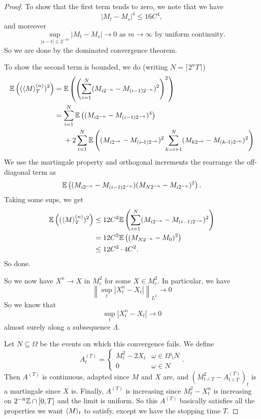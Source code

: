 \documentclass[a4paper]{article}
\begin{document}
\begin{proof}
  To show that the first term tends to zero, we note that we have
  \[
    |M_t - M_s|^4 \leq 16 C^4,
  \]
  and moreover
  \[
    \sup_{|s - t| \leq 2^{-m}} |M_t - M_s| \to 0\text{ as }m \to \infty\text{ by uniform continuity}.
  \]
  So we are done by the dominated convergence theorem.

  To show the second term is bounded, we do (writing $N = \lceil 2^n T\rceil$)
  \begin{align*}
    \E\left((\bra M\ket_T^{(n)})^2\right) &= \E \left(\left(\sum_{i = 1}^{N} (M_{i 2^{-n}} - M_{(i - 1)2^{-n}})^2 \right)^2\right)\\
    &= \sum_{i = 1}^N \E \left( (M_{i 2^{-n}}- M_{(i - 1)2^{-n}})^4\right) \\
    &\hphantom{{}={}}+ 2 \sum_{i = 1}^N\E \left((M_{i 2^{-\!n}} - M_{(i\!-\!1)2^{-\!n}})^2 \sum_{k = i + 1}^N (M_{k2^{-\!n}} - M_{(k\!-\!1)2^{-\!n}})^2\right)
  \end{align*}
  We use the martingale property and orthogonal increments the rearrange the off-diagonal term as
  \[
    \mathbb{E}\left((M_{i2^{-n}} - M_{(i - 1)2^{-n}})(M_{N2^{-n}} - M_{i 2^{-n}})^2\right).
  \]
  Taking some sups, we get
  \begin{align*}
    \mathbb{E}\left((\langle M\rangle_T^{(n)})^2\right) &\leq 12 C^2 \mathbb{E} \left(\sum_{i = 1}^N (M_{i 2^{-n}} - M_{(i - 1)2^{-n}})^2\right)\\
    &= 12C^2 \mathbb{E} \left((M_{N 2^{-n}} - M_0)^2\right)\\
    &\leq 12 C^2 \cdot 4 C^2.
  \end{align*}
  So done.

  So we now have $X^n \to X$ in $M^2_c$ for some $X \in M_c^2$. In particular, we have
  \[
    \left\|\sup_t |X_t^n - X_t|\right\|_{L^2} \to 0
  \]
  So we know that
  \[
    \sup_t |X_t^n - X_t| \to 0
  \]
  almost surely along a subsequence $\Lambda$.

  Let $N \subseteq \Omega$ be the events on which this convergence fails. We define
  \[
    A_t^{(T)} =
    \begin{cases}
      M_t^2 - 2X_t& \omega \in \Omega \setminus N\\
      0 & \omega \in N
    \end{cases}.
  \]
  Then $A^{(T)}$ is continuous, adapted since $M$ and $X$ are, and $(M_{t \wedge T}^2 - A^{(T)}_{t \wedge T})_t$ is a martingale since $X$ is. Finally, $A^{(T)}$ is increasing since $M_t^2 - X_t^n$ is increasing on $2^{-n} \mathbb{Z} \cap [0, T]$ and the limit is uniform. So this $A^{(T)}$ basically satisfies all the properties we want $\langle M\rangle_t$ to satisfy, except we have the stopping time $T$.


\end{proof}
\end{document}
